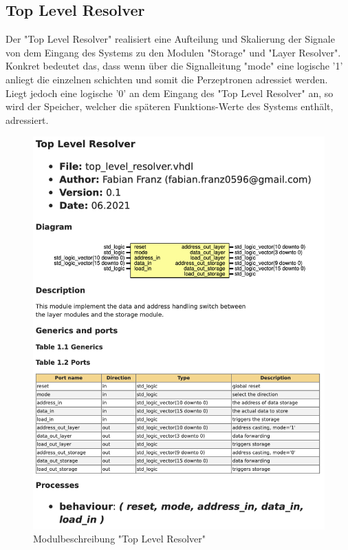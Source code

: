 \documentclass{article}
\numberwithin{equation}{section}
\begin{document}
\subsection{Top Level Resolver}
Der "Top Level Resolver" realisiert eine Aufteilung und Skalierung der Signale von dem 
Eingang des Systems zu den Modulen "Storage" und "Layer Resolver". Konkret bedeutet
das, dass wenn über die Signalleitung "mode" eine logische '1' anliegt die einzelnen 
schichten und somit die Perzeptronen adressiet werden. Liegt jedoch eine logische '0'
an dem Eingang des "Top Level Resolver" an, so wird der Speicher, welcher die späteren
Funktions-Werte des Systems enthält, adressiert.
\begin{figure}[htb!]
    \begin{center}
      \includegraphics[width=13.25cm]{ModuleDescription/top_level_resolver.png}
    \end{center}
    \caption{Modulbeschreibung "Top Level Resolver"} \label{fig:top_level_resolver}
  \end{figure}
\end{document}
